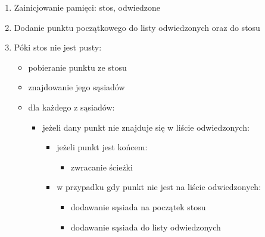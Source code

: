 \documentclass{article}
\begin{document}
\begin{enumerate}
\item Zainicjowanie pamięci: stos, odwiedzone
\item Dodanie punktu początkowego do listy odwiedzonych oraz do stosu
\item Póki stos nie jest pusty:
	\begin{itemize}
	\item pobieranie punktu ze stosu
	\item znajdowanie jego sąsiadów
	\item dla każdego z sąsiadów:
	\begin{itemize}
		\item jeżeli dany punkt nie znajduje się w liście odwiedzonych:
			\begin{itemize}
			\item jeżeli punkt jest końcem:
				\begin{itemize}
				\item zwracanie ścieżki
				\end{itemize}
			\item w przypadku gdy punkt nie jest na liście odwiedzonych:
				\begin{itemize}
				\item dodawanie sąsiada na początek stosu
				\item dodawanie sąsiada do listy odwiedzonych				
				\end{itemize}
			\end{itemize}
		\end{itemize}		
	\end{itemize}
\end{enumerate}
\newpage
\end{document}
